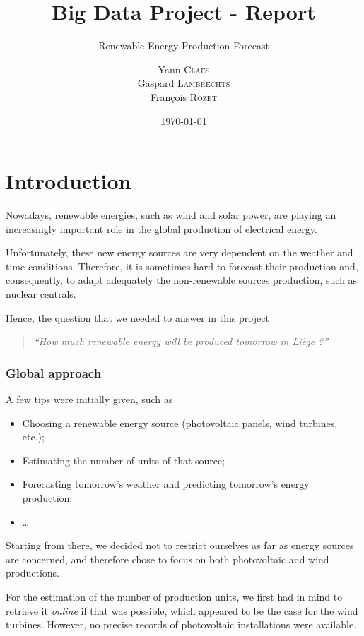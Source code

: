 \documentclass[a4paper, 12pt]{article}
\institute{University of Liège}
\title{Big Data Project - Report}
\subtitle{Renewable Energy Production Forecast}
\author{Yann \textsc{Claes}\\Gaspard \textsc{Lambrechts}\\François \textsc{Rozet}}
\date{\today}
\begin{document}
\maketitle

\romantableofcontents

\part*{Introduction}

Nowadays, renewable energies, such as wind and solar power, are playing an increasingly important role in the global production of electrical energy.

Unfortunately, these new energy sources are very dependent on the weather and time conditions. Therefore, it is sometimes hard to forecast their production and, consequently, to adapt adequately the non-renewable sources production, such as nuclear centrals.

Hence, the question that we needed to answer in this project

\begin{quote}
    \emph{\enquote{How much renewable energy will be produced tomorrow in Liège ?}}
\end{quote}

\section*{Global approach}

A few tips were initially given, such as

\begin{itemize}
    \item Choosing a renewable energy source (photovoltaic panels, wind turbines, etc.);
    \item Estimating the number of units of that source;
    \item Forecasting tomorrow's weather and predicting tomorrow's energy production;
    \item \dots
\end{itemize}

Starting from there, we decided not to restrict ourselves as far as energy sources are concerned, and therefore chose to focus on both photovoltaic and wind productions. 

For the estimation of the number of production units, we first had in mind to retrieve it \emph{online} if that was possible, which appeared to be the case for the wind turbines. However, no precise records of photovoltaic installations were available.
\end{document}
